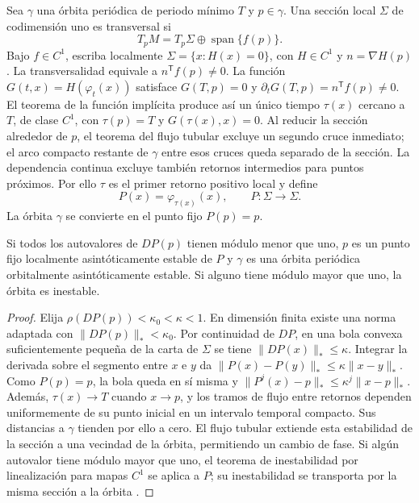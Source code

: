 Sea \(\gamma\) una órbita periódica de periodo mínimo \(T\) y
\(p\in\gamma\). Una sección local \(\Sigma\) de codimensión uno es transversal
si
\begin{equation}
 T_pM=T_p\Sigma\oplus\operatorname{span}\{f(p)\}.
 \label{geo:eq:transverse-section}
\end{equation}
Bajo \(f\in C^1\), escriba localmente
\(\Sigma=\{x:H(x)=0\}\), con \(H\in C^1\) y
\(n=\nabla H(p)\). La transversalidad equivale a
\(n^{\mathsf T}f(p)\ne0\). La función
\(G(t,x)=H(\varphi_t(x))\) satisface
\(G(T,p)=0\) y \(\partial_tG(T,p)=n^{\mathsf T}f(p)\ne0\).
El teorema de la función implícita produce así un único tiempo
\(\tau(x)\) cercano a \(T\), de clase \(C^1\), con
\(\tau(p)=T\) y \(G(\tau(x),x)=0\).
Al reducir la sección alrededor de \(p\), el teorema del flujo tubular
excluye un segundo cruce inmediato; el arco compacto restante de
\(\gamma\) entre esos cruces queda separado de la sección.
La dependencia continua excluye también retornos intermedios para puntos
próximos. Por ello \(\tau\) es el primer retorno positivo local y define
\begin{equation}
 P(x)=\varphi_{\tau(x)}(x),\qquad P:\Sigma\to\Sigma.
 \label{geo:eq:poincare-map}
\end{equation}
La órbita \(\gamma\) se convierte en el punto fijo \(P(p)=p\).

\begin{proposition}
Si todos los autovalores de \(DP(p)\) tienen módulo menor que uno, \(p\) es un
punto fijo localmente asintóticamente estable de \(P\) y \(\gamma\) es una
órbita periódica orbitalmente asintóticamente estable. Si alguno tiene módulo
mayor que uno, la órbita es inestable.
\end{proposition}

\begin{proof}
Elija \(\rho(DP(p))<\kappa_0<\kappa<1\). En dimensión finita existe una
norma adaptada con \(\|DP(p)\|_*<\kappa_0\). Por continuidad de \(DP\),
en una bola convexa suficientemente pequeña de la carta de \(\Sigma\) se
tiene \(\|DP(x)\|_*\le\kappa\). Integrar la derivada sobre el segmento
entre \(x\) e \(y\) da
\(\|P(x)-P(y)\|_*\le\kappa\|x-y\|_*\).
Como \(P(p)=p\), la bola queda en sí misma y
\(\|P^j(x)-p\|_*\le\kappa^j\|x-p\|_*\).
Además, \(\tau(x)\to T\) cuando \(x\to p\), y los tramos de flujo
entre retornos dependen uniformemente de su punto inicial en un intervalo
temporal compacto. Sus distancias a \(\gamma\) tienden por ello a cero.
El flujo tubular extiende esta estabilidad de la sección a una vecindad de
la órbita, permitiendo un cambio de fase.
Si algún autovalor tiene módulo mayor que uno, el teorema de inestabilidad
por linealización para mapas \(C^1\) se aplica a \(P\); su inestabilidad
se transporta por la misma sección a la órbita
\cite{HirschSmaleDevaney2013,Kuznetsov2023Bifurcation}.
\end{proof}

